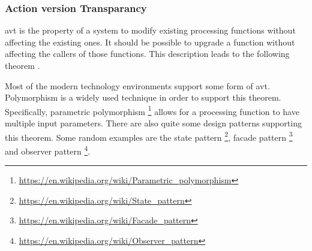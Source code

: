 \subsubsection{Action version Transparancy}
\gls{avt} is the property of a system to modify existing processing functions without
affecting the existing ones. It should be possible to upgrade a function without affecting
the callers of those functions. This description leads to the following theorem
\parencite[282]{mannaert_normalized_2016}.


Most of the modern technology environments support some form of \gls{avt}. Polymorphism is
a widely used technique in order to support this theorem. Specifically, parametric
polymorphism \footnote{\url{https://en.wikipedia.org/wiki/Parametric_polymorphism}} allows
for a processing function to have multiple input parameters. There are also quite some
design patterns supporting this theorem. Some random examples are the state pattern
\footnote{\url{https://en.wikipedia.org/wiki/State_pattern}}, facade pattern
\footnote{\url{https://en.wikipedia.org/wiki/Facade_pattern}} and observer pattern
\footnote{\url{https://en.wikipedia.org/wiki/Observer_pattern}}.